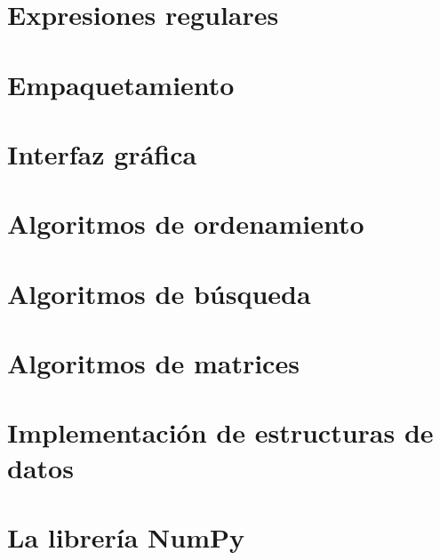 \documentclass{report}
\begin{document}
\clearpage\chapter{Expresiones regulares}

\clearpage\chapter{Empaquetamiento}

\clearpage\chapter{Interfaz gráfica}

\clearpage\chapter{Algoritmos de ordenamiento}

\clearpage\chapter{Algoritmos de búsqueda}

\clearpage\chapter{Algoritmos de matrices}

\clearpage\chapter{Implementación de estructuras de datos}

\clearpage\chapter{La librería NumPy}
\end{document}
